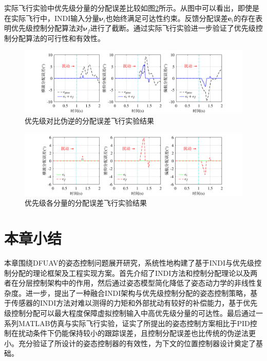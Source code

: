 实际飞行实验中优先级分量的分配误差比较如图\ref{优先级各分量的分配误差飞行实验结果}所示。从图中可以看出，即使是在实际飞行中，INDI输入分量$\boldsymbol{\nu}_i$也始终满足可达性约束。反馈分配误差$\boldsymbol{e}_i$的存在表明优先级控制分配算法对$\boldsymbol{\nu}_f$进行了截断。通过实际飞行实验进一步验证了优先级控制分配算法的可行性和有效性。
\begin{figure}[htbp]
	\centering
	\begin{minipage}[c]{1\textwidth}
        \centering
        \includegraphics[scale=1]{Fig/优先级对比伪逆的分配误差飞行实验结果.pdf}
        \caption{\label{优先级对比伪逆的分配误差飞行实验结果}优先级对比伪逆的分配误差飞行实验结果}
        \end{minipage}
\end{figure}
\begin{figure}[htbp]
	\centering
	\begin{minipage}[c]{1\textwidth}
        \centering
        \includegraphics[scale=1]{Fig/优先级各分量的分配误差飞行实验结果.pdf}
        \caption{\label{优先级各分量的分配误差飞行实验结果}优先级各分量的分配误差飞行实验结果}
        \end{minipage}
\end{figure}

\section{本章小结}

本章围绕DFUAV的姿态控制问题展开研究，系统性地构建了基于INDI与优先级控制分配的理论框架及工程实现方案。首先介绍了INDI方法和控制分配理论以及两者在分层控制架构中的作用，然后通过姿态模型简化降低了姿态动力学的非线性复杂度。进一步，提出了一种融合INDI架构与优先级控制分配的姿态控制策略，基于传感器的INDI方法对难以测得的力矩和外部扰动有较好的补偿能力，基于优先级控制分配可以最大程度保障虚拟控制输入中高优先级分量的可达性。最后通过一系列MATLAB仿真与实际飞行实验，证实了所提出的姿态控制方案相比于PID控制在扰动条件下仍能保持较小的跟踪误差，且控制分配误差也比传统的伪逆法更小。充分验证了所设计的姿态控制器的有效性，为下文的位置控制器设计奠定了基础。